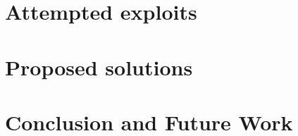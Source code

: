\documentclass{tudelft-report}
\begin{document}
\chapter{Attempted exploits}\label{cha:3}






\chapter{Proposed solutions}\label{cha:4}







\chapter{Conclusion and Future Work}\label{cha:5}


\appendix

%

\printbibliography
\end{document}

